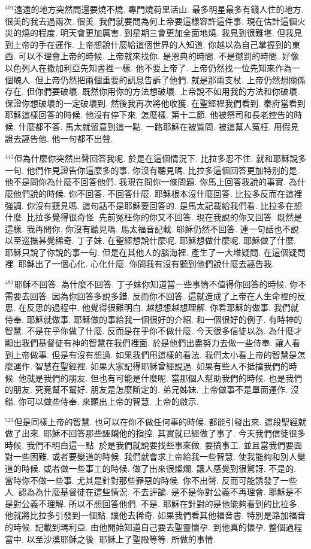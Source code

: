 \documentclass{book}
\begin{document}
$^{401}$遠遠的地方突然間還要燒不燒.
專門燒荷里活山.
最多明星最多有錢人住的地方.
很美的我去過兩次.
很美.
我們就要問為何上帝要這樣容許這件事.
現在估計這個火災的燒的程度.
明天會更加厲害.
到星期三會更加全面地燒.
我見到很難堪.
但我見到上帝的手在運作.
上帝想說什麼給這個世界的人知道.
你越以為自己掌握到的東西.
可以不理會上帝的時候.
上帝就來找你.
是恩典的時間.
不是懲罰的時間.
好像以色列人在撒加利亞先知書裡一樣.
他不要上帝了.
上帝仍然找一位先知來作為一個醜人.
但上帝仍然把兩個重要的訊息告訴了他們.
就是那兩支杖.
上帝仍然想關係存在.
但你們要破壞.
既然你用你的方法想破壞.
上帝說不如用我的方法和你破壞.
保證你想破壞的一定破壞到.
然後我再次將他收獲.
在聖經裡我們看到.
秦府當看到耶穌這樣回答的時候.
他沒有停下來.
怎麼樣.
第十二節.
他被祭司和長老控告的時候.
什麼都不答.
馬太就留意到這一點.
一路耶穌在被質問.
被這幫人冤枉.
用假見證去誣告他.
他一句都不出聲.

$^{441}$但為什麼你突然出聲回答我呢.
於是在這個情況下.
比拉多忍不住.
就和耶穌說多一句.
他們作見證告你這麼多的事.
你沒有聽見嗎.
比拉多這個回答更加特別的是.
他不是問你為什麼不回答他們.
我現在問你一條問題.
你馬上回答我說的事實.
為什麼他們說的時候.
你不回答.
不回答什麼.
耶穌根本沒什麼回答.
比拉多反而在這裡強調.
你沒有聽見嗎.
這句話不是耶穌要回答的.
是馬太記載給我們看.
比拉多在想什麼.
比拉多覺得很奇怪.
先前冤枉你的你又不回答.
現在我說的你又回答.
既然是這樣.
我再問你.
你沒有聽見嗎.
馬太福音記載.
耶穌仍然不回答.
連一句話也不說.
以至巡撫甚覺稀奇.
丁子妹.
在聖經想說什麼呢.
耶穌想做什麼呢.
耶穌做了什麼.
耶穌只說了你說的事一句.
但是在其他人的腦海裡.
產生了一大堆疑問.
在這個疑問裡.
耶穌出了一個心化.
心化什麼.
你問我有沒有聽到他們說什麼去誣告我.

$^{481}$耶穌不回答.
為什麼不回答.
丁子妹你知道當一些事情不值得你回答的時候.
你不需要去回答.
因為你回答多說多錯.
反而你不回答.
這就造成了上帝在人生命裡的反思.
在反思的過程中.
他覺得很難明白.
越想想越想理解.
你看耶穌的做事.
我們就侍奉.
耶穌就做事.
耶穌做的事給我一個很好的介紹.
和一個很好的例子.
有時神的智慧.
不是在乎你做了什麼.
反而是在乎你不做什麼.
今天很多信徒以為.
為什麼才顯出我們基督徒有神的智慧在我們裡面.
於是他們出盡努力去做一些侍奉.
讓人看到上帝做事.
但是有沒有想過.
如果我們用這樣的看法.
我們太小看上帝的智慧是怎麼運作.
智慧在聖經裡.
如果大家記得耶穌曾經說過.
如果有些人不抵擋我們的時候.
他就是我們的朋友.
但也有可能是什麼呢.
當那個人幫助我們的時候.
也是我們的朋友.
究竟幫不幫好.
朋友是怎麼斷定的.
弟兄姊妹.
上帝做事不是單面運作.
沒錯.
你可以做些侍奉.
來顯出上帝的智慧.
上帝的啟示.

$^{521}$但是同樣上帝的智慧.
也可以在你不做任何事的時候.
都能引發出來.
這段聖經就做了出來.
耶穌不回答那些誣衊他的指控.
其實就已經做了事了.
今天我們信徒很多時候.
我們不明白這一點.
於是我們就說要找些事來做.
要搞事工.
並且當我們要面對一些困難.
或者要變道的時候.
我們就會求上帝給我一些智慧.
使我能夠和別人變道的時候.
或者做一些事工的時候.
做了出來很燦爛.
讓人感覺到很驚訝.
不是的.
當時你不做一些事.
尤其是針對那些罪惡的時候.
你不出聲.
反而可能誘發了一些人.
認為為什麼基督徒在這些情況.
不去評論.
是不是你對公義不再理會.
耶穌是不是對公義不理解.
所以不想回答他們.
不是.
耶穌在針對的是他能夠看到的比拉多.
他就將比拉多引發到一個點.
讓他去稀奇.
如果我們看其他福音書.
特別是路加福音的時候.
記載到瑪利亞.
由他開始知道自己要去聖靈懷孕.
到他真的懷孕.
整個過程當中.
以至沙漠耶穌之後.
耶穌上了聖殿等等.
所做的事情.
\end{document}
